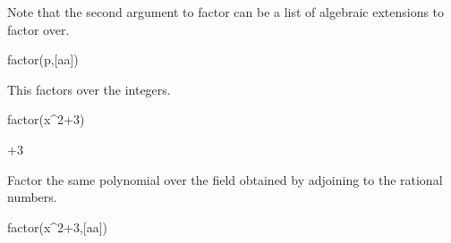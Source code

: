{{{{{{{{{{{\begin{xtc}
\begin{TeXOutput}
\begin{fricasmath}{2}
\TIMES {}%
\end{fricasmath}
\end{TeXOutput}
\end{xtc}
\begin{xtc}
\begin{xtccomment}
Note that the second argument to factor can be a list of
algebraic extensions to factor over.
\end{xtccomment}
\begin{spadsrc}
factor(p,[aa]) 
\end{spadsrc}
\begin{TeXOutput}
\begin{fricasmath}{3}
\TIMES {}\TIMES {}%
\end{fricasmath}
\end{TeXOutput}
\end{xtc}
\begin{xtc}
\begin{xtccomment}
This factors  over the integers.
\end{xtccomment}
\begin{spadsrc}
factor(x^2+3)
\end{spadsrc}
\begin{TeXOutput}
\begin{fricasmath}{4}
+3%
\end{fricasmath}
\end{TeXOutput}
\end{xtc}
\begin{xtc}
\begin{xtccomment}
Factor the same polynomial over the field obtained by adjoining
 to the rational numbers.
\end{xtccomment}
\begin{spadsrc}
factor(x^2+3,[aa]) 
\end{spadsrc}
\begin{TeXOutput}
\begin{fricasmath}{5}
\TIMES {}%
\end{fricasmath}
\end{TeXOutput}

\end{xtc}}}}}}}}}}}}
